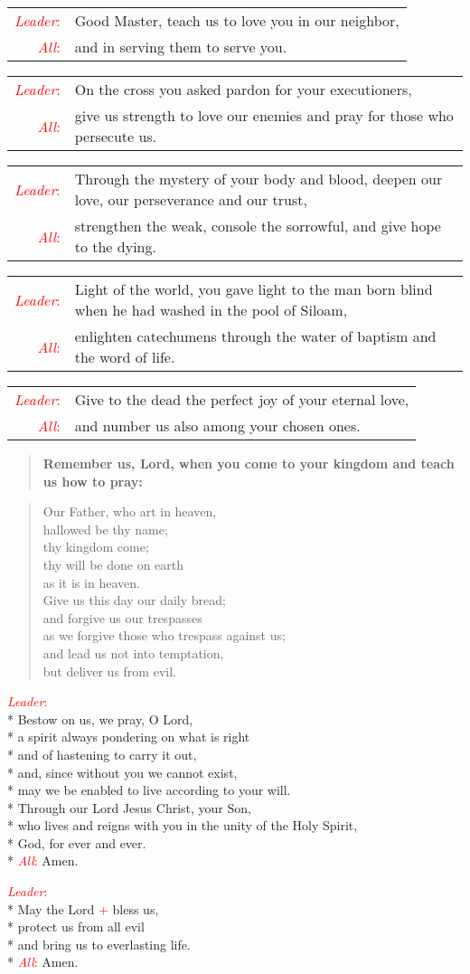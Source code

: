 \documentclass[letterpaper,14pt]{extarticle}
\newcommand{\side}[1]{\flagverse{\textcolor{red}{\textit{#1}}:}}
\newcommand{\sidestar}[1]{\textcolor{red}{\textit{#1}:}}
\newcommand{\rednote}[1]{\textcolor{red}{#1}}
\newlength{\oldindent}
\newcommand{\antiphon}[2]{
	\setlength{\oldindent}{\vindent}
	\setlength{\vindent}{0em}
	\begin{verse}
	\side{#1} \textbf{#2}
	\end{verse}
	\setlength{\vindent}{\oldindent}
}
\newcommand{\intercession}[2]{
	\begin{tabular}[h]{r p{4.25in}}
		\sidestar{Leader} & #1 \\
		\sidestar{All} & #2
	\end{tabular}}
\begin{document}
\intercession{Good Master, teach us to love you in our neighbor,}
{and in serving them to serve you.}

\intercession{On the cross you asked pardon for your executioners,}
{give us strength to love our enemies and pray for those who persecute us.}

\intercession{Through the mystery of your body and blood, deepen our love, our perseverance and our trust,}
{strengthen the weak, console the sorrowful, and give hope to the dying.}

\intercession{Light of the world, you gave light to the man born blind when he had washed in the pool of Siloam,}
{enlighten catechumens through the water of baptism and the word of life.}

\intercession{Give to the dead the perfect joy of your eternal love,}
{and number us also among your chosen ones.}

\antiphon{Leader}{Remember us, Lord, when you come to your kingdom and teach us how to pray:}
	
\begin{verse}
	\side{All} Our Father, who art in heaven,\\ %
hallowed be thy name; \\
thy kingdom come; \\
thy will be done on earth \\
as it is in heaven. \\
Give us this day our daily bread; \\
and forgive us our trespasses \\
as we forgive those who trespass against us; \\
and lead us not into temptation, \\
but deliver us from evil.
\end{verse}


\sidestar{Leader}\\*
Bestow on us, we pray, O Lord, \\*
a spirit always pondering on what is right\\*
and of hastening to carry it out,\\*
and, since without you we cannot exist,\\*
may we be enabled to live according to your will.\\*
Through our Lord Jesus Christ, your Son,\\*
who lives and reigns with you in the unity of the Holy Spirit,\\*
God, for ever and ever.\\*
\sidestar{All} Amen.


\sidestar{Leader}\\*
May the Lord \rednote{+} bless us, \\*
protect us from all evil \\*
and bring us to everlasting life. \\*
\sidestar{All} Amen.
\end{document}

